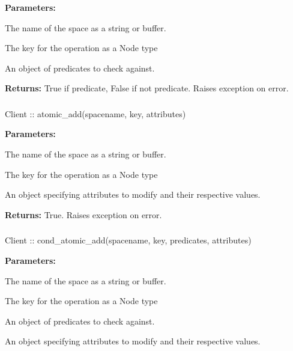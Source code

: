 \noindent\textbf{Parameters:}
\begin{description}[labelindent=\widthof{{\code{predicates}}},leftmargin=*,noitemsep,nolistsep,align=right]
\item[\code{spacename}] The name of the space as a string or buffer.
\item[\code{key}] The key for the operation as a Node type
\item[\code{predicates}] An object of predicates to check against.
\end{description}

\noindent\textbf{Returns:}
True if predicate, False if not predicate.  Raises exception on error.

\subsubsection{}
\label{api:nodejs:atomic_add}
\begin{javascriptcode}
Client :: atomic_add(spacename, key, attributes)
\end{javascriptcode}
\funcdesc 

\noindent\textbf{Parameters:}
\begin{description}[labelindent=\widthof{{\code{attributes}}},leftmargin=*,noitemsep,nolistsep,align=right]
\item[\code{spacename}] The name of the space as a string or buffer.
\item[\code{key}] The key for the operation as a Node type
\item[\code{attributes}] An object specifying attributes to modify and their respective values.
\end{description}

\noindent\textbf{Returns:}
True.  Raises exception on error.

\subsubsection{}
\label{api:nodejs:cond_atomic_add}
\begin{javascriptcode}
Client :: cond_atomic_add(spacename, key, predicates, attributes)
\end{javascriptcode}
\funcdesc 

\noindent\textbf{Parameters:}
\begin{description}[labelindent=\widthof{{\code{predicates}}},leftmargin=*,noitemsep,nolistsep,align=right]
\item[\code{spacename}] The name of the space as a string or buffer.
\item[\code{key}] The key for the operation as a Node type
\item[\code{predicates}] An object of predicates to check against.
\item[\code{attributes}] An object specifying attributes to modify and their respective values.
\end{description}

